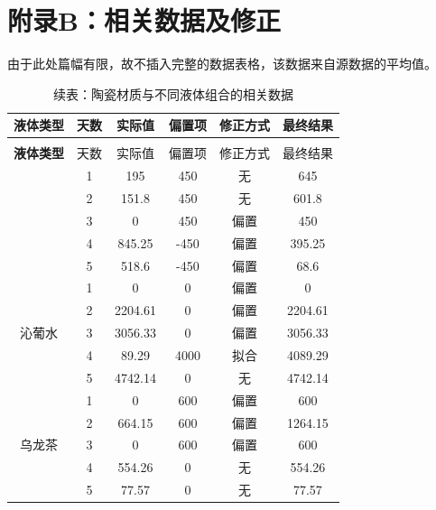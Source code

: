 \documentclass[12pt,a4paper]{ctexart}
\begin{document}
\clearpage
\thispagestyle{empty}
\section{附录B：相关数据及修正}
由于此处篇幅有限，故不插入完整的数据表格，该数据来自源数据的平均值。
\begin{longtable}{c c c c c c}
  \caption{陶瓷材质与不同液体组合的相关数据} \\
  \toprule
  \textbf{液体类型} & 天数 & 实际值 & 偏置项 & 修正方式 & 最终结果 \\
  \midrule
  \endfirsthead  %
  
  \caption*{续表：陶瓷材质与不同液体组合的相关数据} \\
  \toprule
  \textbf{液体类型} & 天数 & 实际值 & 偏置项 & 修正方式 & 最终结果 \\
  \midrule
  \endhead  %
  
  \bottomrule
  \endlastfoot  %

  \multirow{5}{*}{水} 
    & 1 & 195      & 450    & 无       & 645      \\
    & 2 & 151.8    & 450    & 无       & 601.8    \\
    & 3 & 0        & 450    & 偏置     & 450      \\
    & 4 & 845.25   & -450   & 偏置     & 395.25   \\
    & 5 & 518.6    & -450   & 偏置     & 68.6     \\
  \midrule
  
  \multirow{5}{*}{沁葡水} 
    & 1 & 0        & 0      & 偏置     & 0        \\
    & 2 & 2204.61  & 0      & 偏置     & 2204.61  \\
    & 3 & 3056.33  & 0      & 偏置     & 3056.33  \\
    & 4 & 89.29    & 4000   & 拟合     & 4089.29  \\
    & 5 & 4742.14  & 0      & 无       & 4742.14  \\
  \midrule
  
  \multirow{5}{*}{乌龙茶} 
    & 1 & 0        & 600    & 偏置     & 600      \\
    & 2 & 664.15   & 600    & 偏置     & 1264.15  \\
    & 3 & 0        & 600    & 偏置     & 600      \\
    & 4 & 554.26   & 0      & 无       & 554.26   \\
    & 5 & 77.57    & 0      & 无       & 77.57    \\

\end{longtable}
\end{document}
